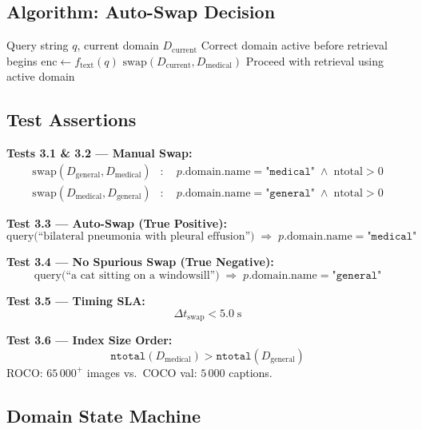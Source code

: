 \documentclass[12pt,a4paper]{article}
\begin{document}
\subsection{Algorithm: Auto-Swap Decision}

\begin{algorithm}[H]
\caption{Auto-domain-swap within \texttt{query()}}
\label{alg:autoswap}
\begin{algorithmic}[1]
\Require Query string $q$, current domain $D_{\text{current}}$
\Ensure Correct domain active before retrieval begins
\State $\text{enc} \gets f_{\text{text}}(q)$
  \State $\text{swap}(D_{\text{current}}, D_{\text{medical}})$
\EndIf
\State Proceed with retrieval using active domain
\end{algorithmic}
\end{algorithm}

\subsection{Test Assertions}

\textbf{Tests 3.1 \& 3.2 --- Manual Swap:}
\begin{align*}
  \text{swap}(D_{\text{general}}, D_{\text{medical}})&:\quad p.\text{domain.name} = \texttt{"medical"} \;\land\; \text{ntotal} > 0\\
  \text{swap}(D_{\text{medical}}, D_{\text{general}})&:\quad p.\text{domain.name} = \texttt{"general"} \;\land\; \text{ntotal} > 0
\end{align*}

\textbf{Test 3.3 --- Auto-Swap (True Positive):}
\[
  \text{query}\bigl(\text{``bilateral pneumonia with pleural effusion''}\bigr)
  \;\Rightarrow\; p.\text{domain.name} = \texttt{"medical"}
\]

\textbf{Test 3.4 --- No Spurious Swap (True Negative):}
\[
  \text{query}\bigl(\text{``a cat sitting on a windowsill''}\bigr)
  \;\Rightarrow\; p.\text{domain.name} = \texttt{"general"}
\]

\textbf{Test 3.5 --- Timing SLA:}
\[
  \Delta t_{\text{swap}} < 5.0\;\text{s}
\]

\textbf{Test 3.6 --- Index Size Order:}
\[
  \texttt{ntotal}(D_{\text{medical}}) > \texttt{ntotal}(D_{\text{general}})
\]
ROCO: $65\,000^+$ images vs.\ COCO val: $5\,000$ captions.

\subsection{Domain State Machine}
\end{document}
